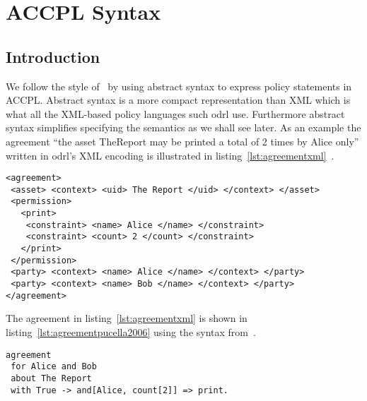 \chapter{ACCPL Syntax}
\label{chap:odrl0syntax}

\section{Introduction}

We follow the style of~\cite{pucella2006} by using abstract syntax to express policy statements in \ac{ACCPL}. Abstract syntax is a more compact representation than XML which is what all the XML-based policy languages such \ac{odrl} use. Furthermore abstract syntax simplifies specifying the semantics as we shall see later. As an example the agreement ``the asset TheReport may be printed a total of 2 times by Alice only'' written in \ac{odrl}'s XML encoding is illustrated in listing~\ref{lst:agreementxml}~\cite{pucella2006}. 


\lstset{language=XML}
\begin{lstlisting}[caption={Agreement for Alice and Bob in XML},label={lst:agreementxml}]
<agreement>
 <asset> <context> <uid> The Report </uid> </context> </asset>
 <permission>
   <print>
    <constraint> <name> Alice </name> </constraint>
    <constraint> <count> 2 </count> </constraint>
   </print>
 </permission>
 <party> <context> <name> Alice </name> </context> </party>
 <party> <context> <name> Bob </name> </context> </party>
</agreement>
\end{lstlisting}

The agreement in listing~\ref{lst:agreementxml} is shown in listing~\ref{lst:agreementpucella2006} using the syntax from~\cite{pucella2006}.

\lstset{language=Pucella2006}
\begin{minipage}[c]{0.95\textwidth}
\begin{lstlisting}[frame=single, caption={Agreement for Alice and Bob as BNF (as used in~\cite{pucella2006})},label={lst:agreementpucella2006}]
agreement
 for Alice and Bob 
 about The Report 
 with True -> and[Alice, count[2]] => print.
\end{lstlisting}
\end{minipage} 

